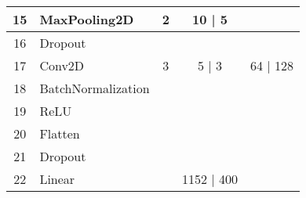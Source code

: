 \documentclass[10pt,a4paper]{article}
\begin{document}
\begin{table}[]
\begin{tabular}{|c|l|c|c|c|}
15                 & MaxPooling2D                             & 2                                                              & 10 | 5                                                                      &                                                                            \\ \hline
16                 & Dropout                                  &                                                                &                                                                             &                                                                            \\ \hline
17                 & Conv2D                                   & 3                                                              & 5 | 3                                                                       & 64 | 128                                                                   \\ \hline
18                 & BatchNormalization                       &                                                                &                                                                             &                                                                            \\ \hline
19                 & ReLU                                     &                                                                &                                                                             &                                                                            \\ \hline
20                 & Flatten                                  &                                                                &                                                                             &                                                                            \\ \hline
21                 & Dropout                                  &                                                                &                                                                             &                                                                            \\ \hline
22                 & Linear                                   &                                                                & 1152 | 400                                                                  &                                                                            \\ \hline

\end{tabular}
\end{table}
\end{document}
